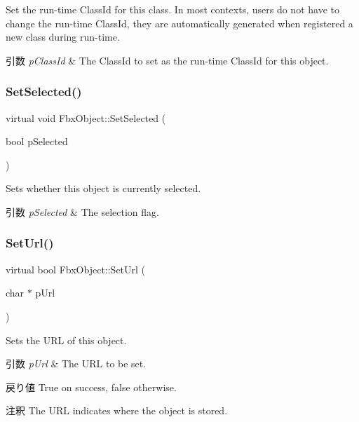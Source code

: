 Set the run-\/time Class\+Id for this class. In most contexts, users do not have to change the run-\/time Class\+Id, they are automatically generated when registered a new class during run-\/time. 
\begin{DoxyParams}{引数}
{\em p\+Class\+Id} & The Class\+Id to set as the run-\/time Class\+Id for this object. \\
\hline
\end{DoxyParams}
\mbox{\label{class_fbx_object_ab61c3e576aaf899deda673702c0a1b79}} 
\subsubsection{\texorpdfstring{Set\+Selected()}{SetSelected()}}
{\footnotesize\ttfamily virtual void Fbx\+Object\+::\+Set\+Selected (\begin{DoxyParamCaption}\item[{bool}]{p\+Selected }\end{DoxyParamCaption})\hspace{0.3cm}{\ttfamily [virtual]}}

Sets whether this object is currently selected. 
\begin{DoxyParams}{引数}
{\em p\+Selected} & The selection flag. \\
\hline
\end{DoxyParams}
\mbox{\label{class_fbx_object_a414b0f4a9568636192a9063a13f8a61a}} 
\subsubsection{\texorpdfstring{Set\+Url()}{SetUrl()}}
{\footnotesize\ttfamily virtual bool Fbx\+Object\+::\+Set\+Url (\begin{DoxyParamCaption}\item[{char $\ast$}]{p\+Url }\end{DoxyParamCaption})\hspace{0.3cm}{\ttfamily [virtual]}}

Sets the U\+RL of this object. 
\begin{DoxyParams}{引数}
{\em p\+Url} & The U\+RL to be set. \\
\hline
\end{DoxyParams}
\begin{DoxyReturn}{戻り値}
{\ttfamily True} on success, {\ttfamily false} otherwise. 
\end{DoxyReturn}
\begin{DoxyRemark}{注釈}
The U\+RL indicates where the object is stored. 
\end{DoxyRemark}
\mbox{\label{class_fbx_object_ac37f77806bfd54d6a41ca6158768deb0}} 
